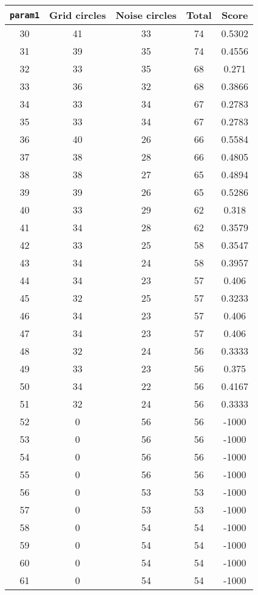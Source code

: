 \documentclass[letterpaper, 12pt]{article}
\begin{document}
\begin{longtable}{|c|c|c|c|c|}
\hline
\textbf{\texttt{param1}} & \textbf{Grid circles} & \textbf{Noise circles} & \textbf{Total} & \textbf{Score} \\
\hline
30 & 41 & 33 & 74 & 0.5302 \\
\hline
31 & 39 & 35 & 74 & 0.4556 \\
\hline
32 & 33 & 35 & 68 & 0.271 \\
\hline
33 & 36 & 32 & 68 & 0.3866 \\
\hline
34 & 33 & 34 & 67 & 0.2783 \\
\hline
35 & 33 & 34 & 67 & 0.2783 \\
\hline
36 & 40 & 26 & 66 & 0.5584 \\
\hline
37 & 38 & 28 & 66 & 0.4805 \\
\hline
38 & 38 & 27 & 65 & 0.4894 \\
\hline
39 & 39 & 26 & 65 & 0.5286 \\
\hline
40 & 33 & 29 & 62 & 0.318 \\
\hline
41 & 34 & 28 & 62 & 0.3579 \\
\hline
42 & 33 & 25 & 58 & 0.3547 \\
\hline
43 & 34 & 24 & 58 & 0.3957 \\
\hline
44 & 34 & 23 & 57 & 0.406 \\
\hline
45 & 32 & 25 & 57 & 0.3233 \\
\hline
46 & 34 & 23 & 57 & 0.406 \\
\hline
47 & 34 & 23 & 57 & 0.406 \\
\hline
48 & 32 & 24 & 56 & 0.3333 \\
\hline
49 & 33 & 23 & 56 & 0.375 \\
\hline
50 & 34 & 22 & 56 & 0.4167 \\
\hline
51 & 32 & 24 & 56 & 0.3333 \\
\hline
52 & 0 & 56 & 56 & -1000 \\
\hline
53 & 0 & 56 & 56 & -1000 \\
\hline
54 & 0 & 56 & 56 & -1000 \\
\hline
55 & 0 & 56 & 56 & -1000 \\
\hline
56 & 0 & 53 & 53 & -1000 \\
\hline
57 & 0 & 53 & 53 & -1000 \\
\hline
58 & 0 & 54 & 54 & -1000 \\
\hline
59 & 0 & 54 & 54 & -1000 \\
\hline
60 & 0 & 54 & 54 & -1000 \\
\hline
61 & 0 & 54 & 54 & -1000 \\

\end{longtable}
\end{document}
